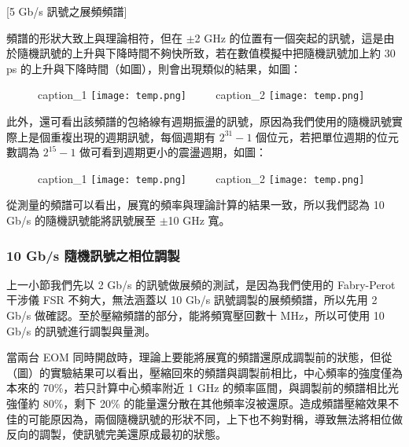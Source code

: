\documentclass[class=NCU_thesis, crop=false]{standalone}
\begin{document}
[5 Gb/s 訊號之展頻頻譜]

頻譜的形狀大致上與理論相符，但在 $\pm$2 GHz 的位置有一個突起的訊號，這是由於隨機訊號的上升與下降時間不夠快所致，若在數值模擬中把隨機訊號加上約 30 ps 的上升與下降時間（如圖），則會出現類似的結果，如圖：

\begin{figure}[!hbt]
    \centering
    \subcaptionbox
        {caption\_1
        \label{fig:subfig_fig1}}
        {\texttt{[image: temp.png]}}
    ~~~~
    \subcaptionbox
        {caption\_2
        \label{fig:subfig_fig2}}
        {\texttt{[image: temp.png]}}
\end{figure}


此外，還可看出該頻譜的包絡線有週期振盪的訊號，原因為我們使用的隨機訊號實際上是個重複出現的週期訊號，每個週期有 $2^{31}-1$ 個位元，若把單位週期的位元數調為 $2^{15}-1$ 做可看到週期更小的震盪週期，如圖：

\begin{figure}[!hbt]
    \centering
    \subcaptionbox
        {caption\_1
        \label{fig:subfig_fig1}}
        {\texttt{[image: temp.png]}}
    ~~~~
    \subcaptionbox
        {caption\_2
        \label{fig:subfig_fig2}}
        {\texttt{[image: temp.png]}}
\end{figure}

從測量的頻譜可以看出，展寬的頻率與理論計算的結果一致，所以我們認為 10 Gb/s 的隨機訊號能將訊號展至 $\pm$10 GHz 寬。

\subsubsection{10 Gb/s 隨機訊號之相位調製}

上一小節我們先以 2 Gb/s 的訊號做展頻的測試，是因為我們使用的 Fabry-Perot 干涉儀 FSR 不夠大，無法涵蓋以 10 Gb/s 訊號調製的展頻頻譜，所以先用 2 Gb/s 做確認。至於壓縮頻譜的部分，能將頻寬壓回數十 MHz，所以可使用 10 Gb/s 的訊號進行調製與量測。

當兩台 EOM 同時開啟時，理論上要能將展寬的頻譜還原成調製前的狀態，但從（圖）的實驗結果可以看出，壓縮回來的頻譜與調製前相比，中心頻率的強度僅為本來的 70\%，若只計算中心頻率附近 1 GHz 的頻率區間，與調製前的頻譜相比光強僅約 80\%，剩下 20\% 的能量還分散在其他頻率沒被還原。造成頻譜壓縮效果不佳的可能原因為，兩個隨機訊號的形狀不同，上下也不夠對稱，導致無法將相位做反向的調製，使訊號完美還原成最初的狀態。
\end{document}
